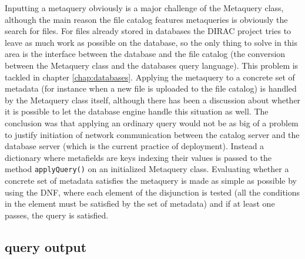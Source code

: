 Inputting a metaquery obviously is a major challenge of the Metaquery class, although the main reason the file
catalog features metaqueries is obviously the search for files. For files already stored in databases the DIRAC
project tries to leave as much work as possible on the database, so the only thing to solve in this area is the 
interface between the database and the file catalog (the conversion between the Metaquery class and the databases
query language). This problem is tackled in chapter \ref{chap:databases}. Applying the metaquery to a concrete 
set of metadata (for instance when a new file is uploaded to the file catalog) is handled by the Metaquery class 
itself, although there has been a discussion about whether it is possible to let the database engine handle this 
situation as well. The conclusion was that applying an ordinary query would not be as big of a problem to 
justify initiation of network communication between the catalog server and the database server (which is the 
current practice of deployment). Instead a dictionary where metafields are keys indexing their values is passed 
to the method \texttt{applyQuery()} on an initialized Metaquery class. Evaluating whether a concrete set of 
metadata satisfies the metaquery is made as simple as possible by using the DNF, where each element of the 
disjunction is tested (all the conditions in the element must be satisfied by the set of metadata) and if at least
one passes, the query is satisfied.

\subsection{query output}

